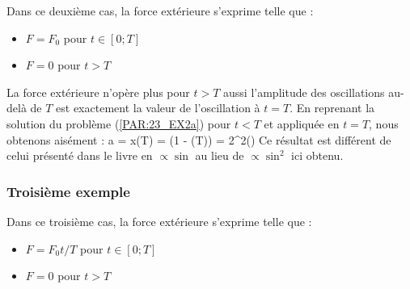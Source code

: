 Dans ce deuxi\`eme cas, la force ext\'erieure s'exprime telle que :
\begin{itemize}
	\item $F = F_{0}$ pour $t \in [0;T]$
	\item $F = 0$ pour $t > T$
\end{itemize}

La force ext\'erieure n'op\`ere plus pour $t > T$ aussi l'amplitude des oscillations au-del\`a de $T$ est exactement la valeur de l'oscillation \`a $t = T$. En reprenant la solution du probl\`eme (\ref{PAR:23_EX2a}) pour $t < T$ et appliqu\'ee en $t = T$, nous obtenons ais\'ement :
\be
	a = x(T) = (1 - \cos(\omega T)) = 2\sin^{2}\left(\right)
\ee
Ce r\'esultat est diff\'erent de celui pr\'esent\'e dans le livre en $\propto \sin$ au lieu de $\propto \sin^{2}$ ici obtenu.

\subsubsection{Troisi\`eme exemple}

Dans ce troisi\`eme cas, la force ext\'erieure s'exprime telle que :
\begin{itemize}
	\item $F = F_{0}t/T$ pour $t \in [0;T]$
	\item $F = 0$ pour $t > T$
\end{itemize}

